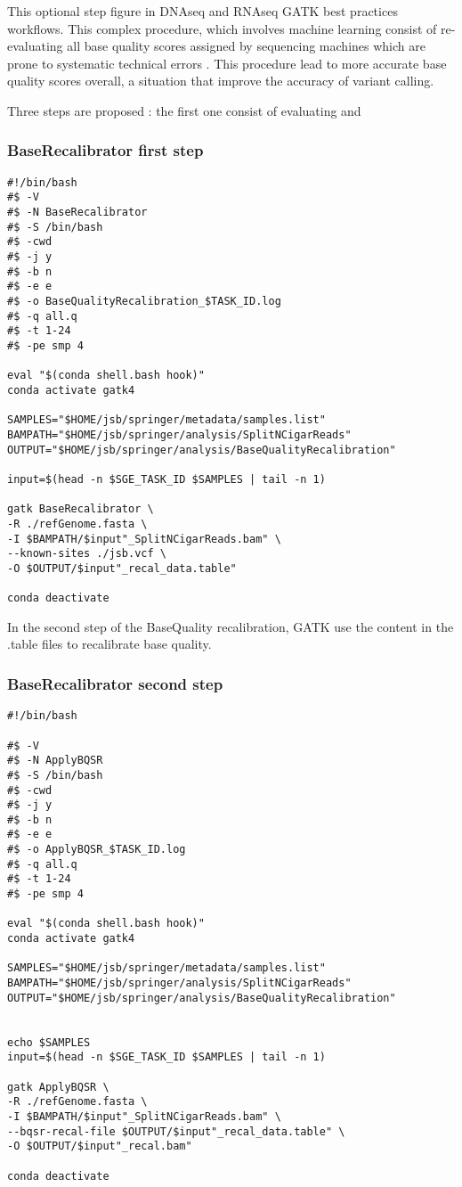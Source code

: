 This optional step figure in DNAseq and RNAseq GATK best practices workflows. This complex procedure, which involves machine learning  consist of re-evaluating all base quality scores assigned by sequencing machines which are prone to systematic technical errors \cite{GATK_BaseQuality}. This procedure lead to more accurate base quality scores overall, a situation that improve the accuracy of variant calling.


Three steps are proposed : the first one consist of evaluating and 

\subsubsection{BaseRecalibrator first step}
\begin{verbatim}
#!/bin/bash
#$ -V
#$ -N BaseRecalibrator
#$ -S /bin/bash
#$ -cwd
#$ -j y
#$ -b n
#$ -e e
#$ -o BaseQualityRecalibration_$TASK_ID.log
#$ -q all.q
#$ -t 1-24
#$ -pe smp 4

eval "$(conda shell.bash hook)"
conda activate gatk4

SAMPLES="$HOME/jsb/springer/metadata/samples.list"
BAMPATH="$HOME/jsb/springer/analysis/SplitNCigarReads"
OUTPUT="$HOME/jsb/springer/analysis/BaseQualityRecalibration"

input=$(head -n $SGE_TASK_ID $SAMPLES | tail -n 1)

gatk BaseRecalibrator \
-R ./refGenome.fasta \
-I $BAMPATH/$input"_SplitNCigarReads.bam" \
--known-sites ./jsb.vcf \
-O $OUTPUT/$input"_recal_data.table"

conda deactivate
\end{verbatim}


In the second step of the BaseQuality recalibration, GATK use the content in the .table files to recalibrate base quality.


\subsubsection{BaseRecalibrator second step}
\begin{verbatim}
#!/bin/bash

#$ -V
#$ -N ApplyBQSR
#$ -S /bin/bash
#$ -cwd
#$ -j y
#$ -b n
#$ -e e
#$ -o ApplyBQSR_$TASK_ID.log
#$ -q all.q
#$ -t 1-24
#$ -pe smp 4

eval "$(conda shell.bash hook)"
conda activate gatk4

SAMPLES="$HOME/jsb/springer/metadata/samples.list"
BAMPATH="$HOME/jsb/springer/analysis/SplitNCigarReads"
OUTPUT="$HOME/jsb/springer/analysis/BaseQualityRecalibration"


echo $SAMPLES
input=$(head -n $SGE_TASK_ID $SAMPLES | tail -n 1)

gatk ApplyBQSR \
-R ./refGenome.fasta \
-I $BAMPATH/$input"_SplitNCigarReads.bam" \
--bqsr-recal-file $OUTPUT/$input"_recal_data.table" \
-O $OUTPUT/$input"_recal.bam"

conda deactivate
\end{verbatim}






